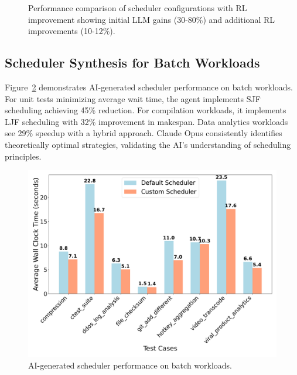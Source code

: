 \begin{figure}[h]
\centering
{}
\caption{Performance comparison of scheduler configurations with RL improvement showing initial LLM gains (30-80\%) and additional RL improvements (10-12\%).}
\label{fig:performance-comparison}
\end{figure}

\subsection{Scheduler Synthesis for Batch Workloads}

Figure~\ref{fig:batch-performance} demonstrates AI-generated scheduler performance on batch workloads. For unit tests minimizing average wait time, the agent implements SJF scheduling achieving 45\% reduction. For compilation workloads, it implements LJF scheduling with 32\% improvement in makespan. Data analytics workloads see 29\% speedup with a hybrid approach. Claude Opus consistently identifies theoretically optimal strategies, validating the AI's understanding of scheduling principles.

\begin{figure}[h]
\centering
\includegraphics[width=0.9\columnwidth]{sections/scheduler_performance_comparison.pdf}
\caption{AI-generated scheduler performance on batch workloads.}
\label{fig:batch-performance}
\end{figure}

